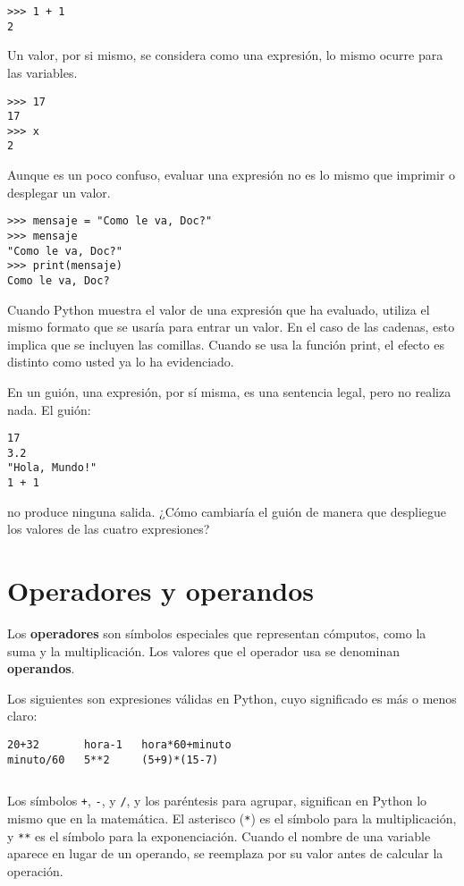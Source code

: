 \begin{lstlisting}
>>> 1 + 1
2
\end{lstlisting}
 

Un valor, por si mismo, se considera como una expresión, lo mismo
ocurre para las variables.

\begin{lstlisting}
>>> 17
17
>>> x
2
\end{lstlisting}
 

Aunque es un poco confuso, evaluar una expresión no es lo mismo que
imprimir o desplegar un valor.

\begin{lstlisting}
>>> mensaje = "Como le va, Doc?"
>>> mensaje
"Como le va, Doc?"
>>> print(mensaje)
Como le va, Doc?
\end{lstlisting}
 

Cuando Python muestra el valor de una expresión que ha evaluado, utiliza
el mismo formato que se usaría para entrar un valor. En el caso de
las cadenas, esto implica que se incluyen las comillas. Cuando se
usa la función print, el efecto es distinto como usted ya lo ha evidenciado.

En un guión, una expresión, por sí misma, es una sentencia legal,
pero no realiza nada. El guión:

\begin{lstlisting}
17
3.2
"Hola, Mundo!"
1 + 1
\end{lstlisting}
 

no produce ninguna salida. ¿Cómo cambiaría el guión de manera que
despliegue los valores de las cuatro expresiones?

\section{Operadores y operandos}

  

Los \textbf{operadores} son símbolos especiales que representan cómputos,
como la suma y la multiplicación. Los valores que el operador usa
se denominan \textbf{operandos}.

Los siguientes son expresiones válidas en Python, cuyo significado
es más o menos claro: 

\begin{lstlisting}
20+32       hora-1   hora*60+minuto   
minuto/60   5**2     (5+9)*(15-7)
\end{lstlisting}
\begin{verbatim}

\end{verbatim}
Los símbolos \texttt{+}, \texttt{-}, y \texttt{/}, y los paréntesis
para agrupar, significan en Python lo mismo que en la matemática.
El asterisco (\texttt{{*}}) es el símbolo para la multiplicación,
y \texttt{{*}{*}} es el símbolo para la exponenciación. Cuando el
nombre de una variable aparece en lugar de un operando, se reemplaza
por su valor antes de calcular la operación.

